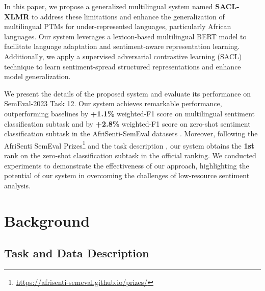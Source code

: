 \documentclass[11pt]{article}
\begin{document}
In this paper, we propose a generalized multilingual system named \textbf{SACL-XLMR} to address these limitations and enhance the generalization of multilingual PTMs for under-represented languages, particularly African languages. Our system leverages a lexicon-based multilingual BERT model to facilitate language adaptation and sentiment-aware representation learning. Additionally, we apply a supervised adversarial contrastive learning (SACL) technique \citep{hu2023supervised} to learn sentiment-spread structured representations and enhance model generalization.

We present the details of the proposed system and evaluate its performance on SemEval-2023 Task 12. Our system achieves remarkable performance, outperforming baselines by \textbf{+1.1\%} weighted-F1 score on multilingual sentiment classification subtask and by \textbf{+2.8\%} weighted-F1 score on zero-shot sentiment classification subtask in the AfriSenti-SemEval datasets \citep{muhammad2023afrisenti}. 
Moreover, following the AfriSenti SemEval Prizes\footnote{\url{https://afrisenti-semeval.github.io/prizes/}} and the task description \citep{muhammadSemEval2023}, our system obtains the \textbf{1st} rank on the zero-shot classification subtask in the official ranking.
We conducted experiments to demonstrate the effectiveness of our approach, highlighting the potential of our system in overcoming the challenges of low-resource sentiment analysis.


\section{Background}

\subsection{Task and Data Description}
\end{document}
